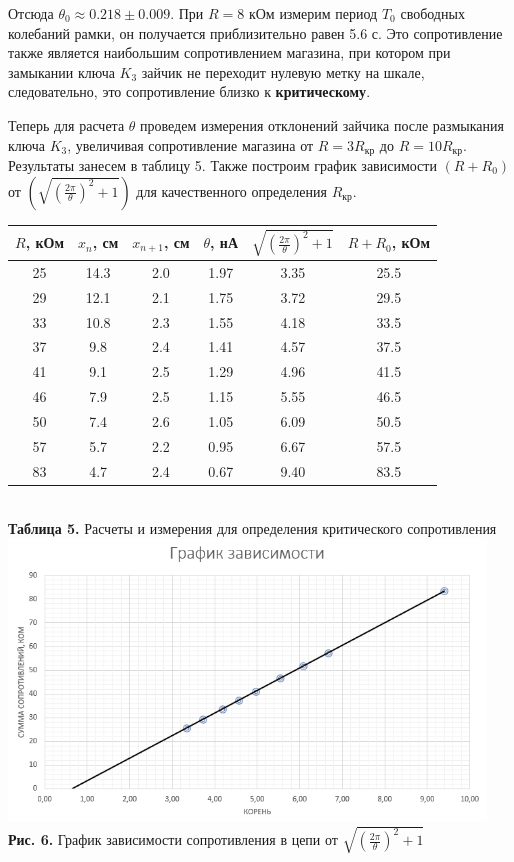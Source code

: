 \documentclass[a4paper,12pt]{article} %
\begin{document}
\hfill \break Отсюда $\theta_{0} \approx 0.218 \pm 0.009$. При $R = 8$ кОм измерим период $T_{0}$ свободных колебаний рамки, он получается приблизительно равен 5.6 с. Это сопротивление также является наибольшим сопротивлением магазина, при котором при замыкании ключа $K_{3}$ зайчик не переходит нулевую метку на шкале, следовательно, это сопротивление близко к \textbf{критическому}.

\hfill \break Теперь для расчета $\theta$ проведем измерения отклонений зайчика после размыкания ключа $K_{3}$, увеличивая сопротивление магазина от $R = 3R_\text{кр}$ до $R = 10R_\text{кр}$. Результаты занесем в таблицу 5. Также построим график зависимости $(R+R_{0})$ от $(\sqrt{(\frac{2\pi}{\theta})^2+1})$ для качественного определения $R_\text{кр}$.

\begin{center}
\begin{tabular}{|c|c|c|c|c|c|}\hline
$ R $, кОм & $ x_{n} $, см & $ x_{n+1} $, см & $ \theta $, нА & $ \sqrt{(\frac{2\pi}{\theta})^2+1} $ & $ R+R_{0} $, кОм\\\hline
25 & 14.3 & 2.0 & 1.97 & 3.35 & 25.5 \\\hline
29 & 12.1 & 2.1 & 1.75 & 3.72 & 29.5 \\\hline
33 & 10.8 & 2.3 & 1.55 & 4.18 & 33.5 \\\hline
37 & 9.8 & 2.4 & 1.41 & 4.57 & 37.5 \\\hline
41 & 9.1 & 2.5 & 1.29 & 4.96 & 41.5 \\\hline
46 & 7.9 & 2.5 & 1.15 & 5.55 & 46.5 \\\hline
50 & 7.4 & 2.6 & 1.05 & 6.09 & 50.5 \\\hline
57 & 5.7 & 2.2 & 0.95 & 6.67 & 57.5 \\\hline
83 & 4.7 & 2.4 & 0.67 & 9.40 & 83.5 \\\hline
\end{tabular} \\
\hfill \break \textbf {Таблица 5.} Расчеты и измерения для определения критического сопротивления\\
\includegraphics[width=0.95\textwidth]{3.2.6_6.png}\\
\textbf{Рис. 6.} График зависимости сопротивления в цепи от $ \sqrt{(\frac{2\pi}{\theta})^2+1} $\\
\end{center}
\end{document}
